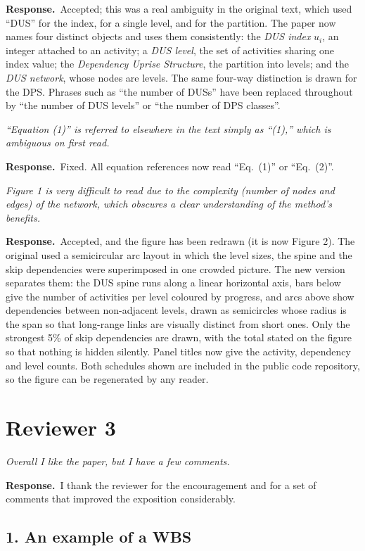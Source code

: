 \documentclass[11pt,a4paper]{article}
\newcommand{\rev}[1]{\medskip\noindent\textit{#1}\par\medskip}
\newcommand{\reply}{\noindent\textbf{Response.}\ }
\begin{document}
\reply Accepted; this was a real ambiguity in the original text, which used
``DUS'' for the index, for a single level, and for the partition. The paper now
names four distinct objects and uses them consistently: the \emph{DUS index}
$u_i$, an integer attached to an activity; a \emph{DUS level}, the set of
activities sharing one index value; the \emph{Dependency Uprise Structure}, the
partition into levels; and the \emph{DUS network}, whose nodes are levels. The
same four-way distinction is drawn for the DPS. Phrases such as ``the number of
DUSs'' have been replaced throughout by ``the number of DUS levels'' or ``the
number of DPS classes''.

\rev{``Equation (1)'' is referred to elsewhere in the text simply as ``(1),''
which is ambiguous on first read.}

\reply Fixed. All equation references now read ``Eq.~(1)'' or ``Eq.~(2)''.

\rev{Figure 1 is very difficult to read due to the complexity (number of nodes
and edges) of the network, which obscures a clear understanding of the method's
benefits.}

\reply Accepted, and the figure has been redrawn (it is now Figure 2). The
original used a semicircular arc layout in which the level sizes, the spine and
the skip dependencies were superimposed in one crowded picture. The new version
separates them: the DUS spine runs along a linear horizontal axis, bars below
give the number of activities per level coloured by progress, and arcs above
show dependencies between non-adjacent levels, drawn as semicircles whose radius
is the span so that long-range links are visually distinct from short ones. Only
the strongest 5\% of skip dependencies are drawn, with the total stated on the
figure so that nothing is hidden silently. Panel titles now give the activity,
dependency and level counts. Both schedules shown are included in the public
code repository, so the figure can be regenerated by any reader.

\section*{Reviewer 3}

\rev{Overall I like the paper, but I have a few comments.}

\reply I thank the reviewer for the encouragement and for a set of comments that
improved the exposition considerably.

\subsection*{1. An example of a WBS}
\end{document}
